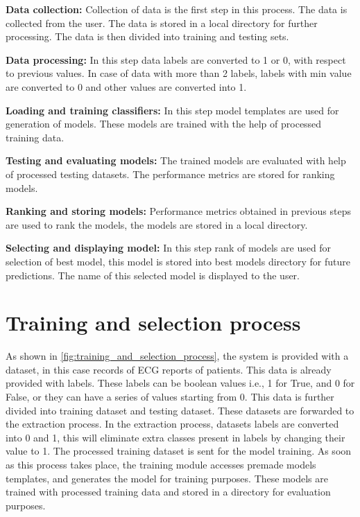 \textbf{Data collection:} Collection of data is the first step in this process. The data is collected from the user. The data is stored in a local directory for further processing. The data is then divided into training and testing sets.

\vspace{-0.5em}
\textbf{Data processing:} In this step data labels are converted to 1 or 0, with respect to previous values. In case of data with more than 2 labels, labels with min value are converted to 0 and other values are converted into 1.

\vspace{-0.5em}
\textbf{Loading and training classifiers:} In this step model templates are used for generation of models. These models are trained with the help of processed training data.

\vspace{-0.5em}
\textbf{Testing and evaluating models:} The trained models are evaluated with help of processed testing datasets. The performance metrics are stored for ranking models.

\vspace{-0.5em}
\textbf{Ranking and storing models:} Performance metrics obtained in previous steps are used to rank the models, the models are stored in a local directory.

\vspace{-0.5em}
\textbf{Selecting and displaying model:} In this step rank of models are used for selection of best model, this model is stored into best models directory for future predictions. The name of this selected model is displayed to the user.

\section{Training and selection process} \label{sec:data_flow}

As shown in \cref{fig:training_and_selection_process}, the system is provided with a dataset, in this case records of ECG reports of patients. This data is already provided with labels. These labels can be boolean values i.e., 1 for True, and 0 for False, or they can have a series of values starting from 0. This data is further divided into training dataset and testing dataset. These datasets are forwarded to the extraction process. In the extraction process, datasets labels are converted into 0 and 1, this will eliminate extra classes present in labels by changing their value to 1. The processed training dataset is sent for the model training. As soon as this process takes place, the training module accesses premade models templates, and generates the model for training purposes. These models are trained with processed training data and stored in a directory for evaluation purposes.

